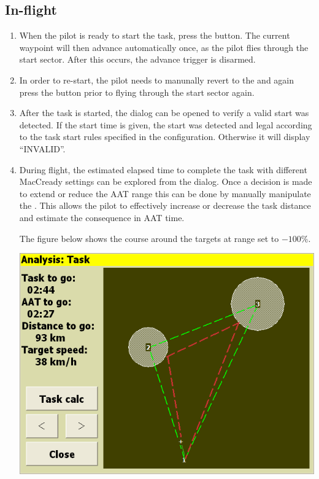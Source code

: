\documentclass[a4paper,12pt]{refrep}
\begin{document}
\subsection*{In-flight}
\begin{enumerate}
\item  When the pilot is ready to start the task, press the  button.  The current waypoint will then advance automatically
once, as the pilot flies through the start sector.  After this occurs, the advance trigger is disarmed.  
\item  In order to re-start, the pilot needs to manunally revert to the
 and again press the  button prior to
flying through the start sector again.
\item  After the task is started, the  dialog can be opened to
verify a valid start was detected. If the start time is given, the start was detected and legal according to 
the task start rules specified in the configuration.  Otherwise it will display ``INVALID''.
\item  During flight, the estimated elapsed time to complete the task with
different MacCready settings can be explored from the  dialog.
Once a decision is made to extend or reduce the AAT range this can be done by
manually manipulate the . This allows the pilot to effectively increase or decrease the task
distance and estimate the consequence in AAT time.

The figure below shows the course around the targets at range set to $-100$\%.
\begin{center}
\includegraphics[angle=0,width=\linewidth,keepaspectratio='true']{figures/aat-short.png}
\end{center}


\end{enumerate}
\end{document}
